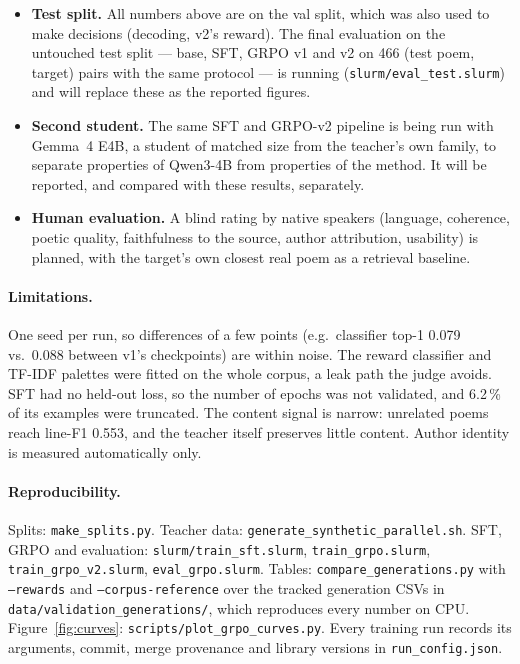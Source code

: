 \documentclass[11pt]{article}
\begin{document}
\begin{itemize}\itemsep2pt
  \item \textbf{Test split.} All numbers above are on the val split, which was
    also used to make decisions (decoding, v2's reward). The final evaluation
    on the untouched test split --- base, SFT, GRPO v1 and v2 on 466 (test
    poem, target) pairs with the same protocol --- is running
    (\texttt{slurm/eval\_test.slurm}) and will replace these as the reported
    figures.
  \item \textbf{Second student.} The same SFT and GRPO-v2 pipeline is being
    run with Gemma~4 E4B, a student of matched size from the teacher's own
    family, to separate properties of Qwen3-4B from properties of the method.
    It will be reported, and compared with these results, separately.
  \item \textbf{Human evaluation.} A blind rating by native speakers
    (language, coherence, poetic quality, faithfulness to the source, author
    attribution, usability) is planned, with the target's own closest real
    poem as a retrieval baseline.
\end{itemize}

\paragraph{Limitations.} One seed per run, so differences of a few points
(e.g.\ classifier top-1 0.079 vs.\ 0.088 between v1's checkpoints) are within
noise. The reward classifier and TF-IDF palettes were fitted on the whole
corpus, a leak path the judge avoids. SFT had no held-out loss, so the number
of epochs was not validated, and 6.2\,\% of its examples were truncated. The
content signal is narrow: unrelated poems reach line-F1 0.553, and the teacher
itself preserves little content. Author identity is measured automatically
only.

{\raggedright\paragraph{Reproducibility.} Splits: \texttt{make\_splits.py}. Teacher data:
\texttt{generate\_synthetic\_parallel.sh}. SFT, GRPO and evaluation:
\texttt{slurm/train\_sft.slurm}, \texttt{train\_grpo.slurm},
\texttt{train\_grpo\_v2.slurm}, \texttt{eval\_grpo.slurm}. Tables:
\texttt{compare\_generations.py} with \texttt{--rewards} and
\texttt{--corpus-reference} over the tracked
generation CSVs in \texttt{data/validation\_generations/}, which reproduces
every number on CPU. Figure~\ref{fig:curves}:
\texttt{scripts/plot\_grpo\_curves.py}. Every training run records its
arguments, commit, merge provenance and library versions in
\texttt{run\_config.json}.\par}
\end{document}
